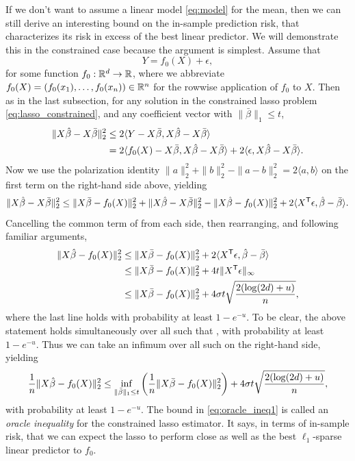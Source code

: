 \documentclass{article}
\begin{document}
If we don't want to assume a linear model \eqref{eq:model} for the mean, then we
can still derive an interesting bound on the in-sample prediction risk, that
characterizes its risk in excess of the best linear predictor. We will
demonstrate this in the constrained case because the argument is
simplest. Assume that 
\[
Y = f_0(X) + \epsilon,
\]  
for some function $f_0 : \mathbb{R}^d \to \mathbb{R}$, where we abbreviate $f_0(X) = (f_0(x_1),
\dots, f_0(x_n)) \in \mathbb{R}^n$ for the rowwise application of $f_0$ to $X$. Then as
in the last subsection, for any solution \smash{$\hbeta$} in the constrained
lasso problem \eqref{eq:lasso_constrained}, and any coefficient vector
\smash{$\bar\beta$} with $\|\bar\beta\|_1 \leq t$,  
\begin{align*}
\|X\hat{\beta} - X\bar\beta\|_2^2 
&\leq 2 \langle Y-X\bar\beta, X\hat{\beta} - X\bar\beta \rangle \\
&= 2 \langle f_0(X) - X\bar\beta, X\hat{\beta} - X\bar\beta \rangle + 
2 \langle \epsilon, X\hat{\beta} - X\bar\beta \rangle.
\end{align*}
Now we use the polarization identity $\|a\|_2^2+\|b\|_2^2-\|a-b\|_2^2 = 2\langle   
a,b\rangle$ on the first term on the right-hand side above, yielding
\[
\|X\hat{\beta} - X\bar\beta\|_2^2 \leq \|X\bar\beta - f_0(X)\|_2^2 + \|X\hat{\beta} -
X\bar\beta\|_2^2 - \|X\hat{\beta} - f_0(X)\|_2^2 + 2 \langle X^{\mathsf{T}} \epsilon, \hat{\beta} -
\bar\beta \rangle. 
\]
Cancelling the common term of  from each 
side, then rearranging, and following familiar arguments, 
\begin{align*}
\|X\hat{\beta} - f_0(X)\|_2^2 
&\leq \|X\bar\beta - f_0(X)\|_2^2 + 2 \langle X^{\mathsf{T}} \epsilon, \hat{\beta} - \bar\beta
  \rangle \\ 
&\leq \|X\bar\beta - f_0(X)\|_2^2 + 4t \| X^{\mathsf{T}}\epsilon\|_\infty \\
&\leq \|X\bar\beta - f_0(X)\|_2^2 + 4 \sigma t \sqrt{\frac{2 (\log(2d) +
  u)}{n}},    
\end{align*}
where the last line holds with probability at least $1-e^{-u}$. To be clear, the
above statement holds simultaneously over all \smash{$\bar\beta$} such that 
, with probability at least $1-e^{-u}$. Thus we
can take an infimum over all such \smash{$\bar\beta$} on the right-hand side,
yielding 
\begin{equation}
\label{eq:oracle_ineq1}
\frac{1}{n} \|X\hat{\beta} - f_0(X)\|_2^2 \leq \inf_{\|\bar\beta\|_1 \leq t} \bigg(
\frac{1}{n} \|X\bar\beta - f_0(X)\|_2^2 \bigg) + 4 \sigma t \sqrt{\frac{2
    (\log(2d) + u)}{n}},  
\end{equation}
with probability at least $1-e^{-u}$. The bound in \eqref{eq:oracle_ineq1} is
called an \emph{oracle inequality} for the constrained lasso estimator. It says,
in terms of in-sample risk, that we can expect the lasso to perform close as
well as the best $\ell_1$-sparse linear predictor to $f_0$.
\end{document}
